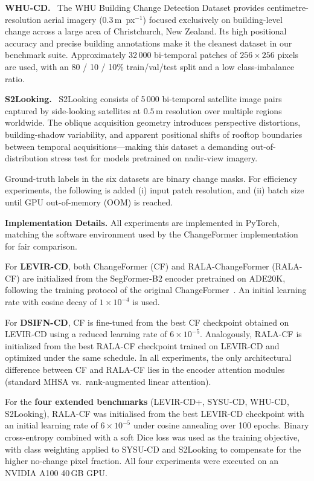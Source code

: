 \documentclass[runningheads]{llncs}
\newcommand{\journal}[1]{{\color{orange}#1}}
\begin{document}
\journal{\noindent \textbf{WHU-CD.}~\cite{Ji2019WHU}
The WHU Building Change Detection Dataset provides centimetre-resolution aerial
imagery ($0.3\,\mathrm{m}$~px$^{-1}$) focused exclusively on building-level
change across a large area of Christchurch, New Zealand.
Its high positional accuracy and precise building annotations make it the
cleanest dataset in our benchmark suite. Approximately 32\,000 bi-temporal
patches of $256\times256$ pixels are used, with an 80 / 10 / 10\% train/val/test
split and a low class-imbalance ratio.}

\journal{\noindent \textbf{S2Looking.}~\cite{ShenS2Looking2021}
S2Looking consists of 5\,000 bi-temporal satellite image pairs captured by
side-looking satellites at $0.5\,\mathrm{m}$ resolution over multiple regions
worldwide. The oblique acquisition geometry introduces perspective distortions,
building-shadow variability, and apparent positional shifts of rooftop boundaries
between temporal acquisitions—making this dataset a demanding out-of-distribution
stress test for models pretrained on nadir-view imagery.

Ground-truth labels in the six datasets are binary change masks. For efficiency experiments, the following is added (i) input patch resolution, and (ii) batch size until GPU out-of-memory (OOM) is reached.
}

\noindent \textbf{Implementation Details.} All experiments are implemented in
PyTorch, matching the software environment used by the ChangeFormer
implementation \cite{Bandara2022ChangeFormer} for fair comparison.

For \textbf{LEVIR-CD}, both ChangeFormer (CF) and RALA-ChangeFormer (RALA-CF)
are initialized from the SegFormer-B2 encoder pretrained on ADE20K, following
the training protocol of the original ChangeFormer~\cite{Bandara2022ChangeFormer}.
An initial learning rate with cosine decay of $1\times10^{-4}$ is used.

For \textbf{DSIFN-CD}, CF is fine-tuned from the best CF checkpoint obtained on
LEVIR-CD using a reduced learning rate of $6\times10^{-5}$. Analogously,
RALA-CF is initialized from the best RALA-CF checkpoint trained on LEVIR-CD and
optimized under the same schedule. In all experiments, the only architectural
difference between CF and RALA-CF lies in the encoder attention modules
(standard MHSA vs.\ rank-augmented linear attention).

\journal{For the \textbf{four extended benchmarks} (LEVIR-CD+, SYSU-CD, WHU-CD,
S2Looking), RALA-CF was initialised from the best LEVIR-CD checkpoint with an
initial learning rate of $6\times10^{-5}$ under cosine annealing over 100
epochs. Binary cross-entropy combined with a soft Dice loss was used as the
training objective, with class weighting applied to SYSU-CD and S2Looking to
compensate for the higher no-change pixel fraction. All four experiments were
executed on an NVIDIA A100 40\,GB GPU.}
\end{document}
